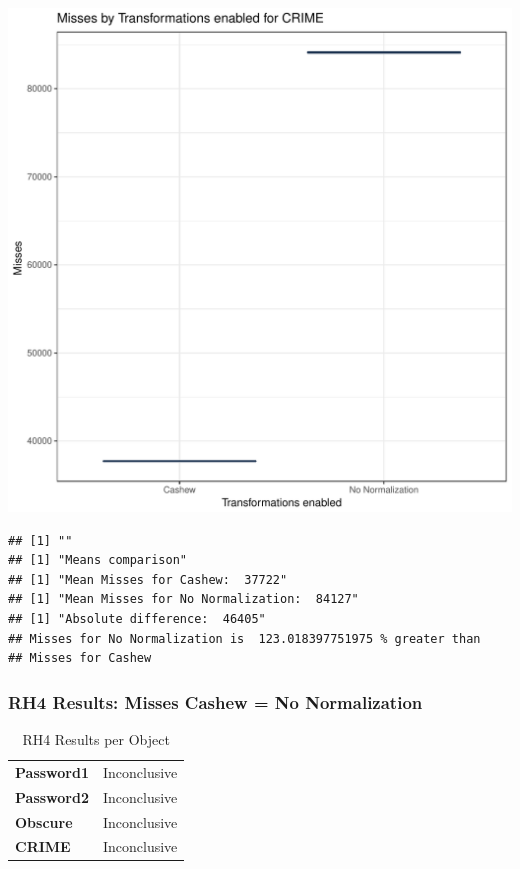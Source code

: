 \documentclass{article}\usepackage[]{graphicx}\usepackage[]{color}
\makeatletter
\def\maxwidth{ %
  \ifdim\Gin@nat@width>\linewidth
    \linewidth
  \else
    \Gin@nat@width
  \fi
}
\newenvironment{kframe}{%
 \def\at@end@of@kframe{}%
 \ifinner\ifhmode%
  \def\at@end@of@kframe{\end{minipage}}%
  \begin{minipage}{\columnwidth}%
 \fi\fi%
 \def\FrameCommand##1{\hskip\@totalleftmargin \hskip-\fboxsep
 \colorbox{shadecolor}{##1}\hskip-\fboxsep
     \hskip-\linewidth \hskip-\@totalleftmargin \hskip\columnwidth}%
 \MakeFramed {\advance\hsize-\width
   \@totalleftmargin\z@ \linewidth\hsize
   \@setminipage}}%
 {\par\unskip\endMakeFramed%
 \at@end@of@kframe}
\newenvironment{knitrout}{}{} %
\makeatother
\begin{document}
\begin{knitrout}
\color{fgcolor}
\includegraphics[width=\maxwidth]{figure/RH4_crime-1} 
\begin{kframe}

{\ttfamily\noindent\bfseries\color{errorcolor}{\#\# Error in eval(expr, envir, enclos): object 'shap\_cashew\_crime' not found}}\begin{verbatim}
## [1] ""
## [1] "Means comparison"
## [1] "Mean Misses for Cashew:  37722"
## [1] "Mean Misses for No Normalization:  84127"
## [1] "Absolute difference:  46405"
## Misses for No Normalization is  123.018397751975 % greater than 
## Misses for Cashew
\end{verbatim}
\end{kframe}
\end{knitrout}


 

	
	\subsubsection{RH4 Results: Misses Cashew = No Normalization}
	
	
	\begin{table}[H]
	\centering
	\caption{RH4 Results per Object}
	\begin{tabular}{ll}
	\textbf{Password1} & Inconclusive \\
	\textbf{Password2} & Inconclusive \\
	\textbf{Obscure} & Inconclusive \\
	\textbf{CRIME} & Inconclusive \\
	\end{tabular}
	\end{table}
\end{document}
